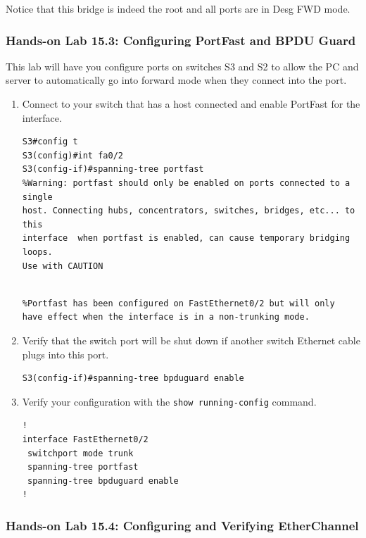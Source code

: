 Notice that this bridge is indeed the root and all ports are in Desg FWD
mode.

\subsubsection[Hands-on Lab 15.3: Configuring PortFast and BPDU
Guard]{\texorpdfstring{\protect\hypertarget{c15.xhtmlux5cux23c15-sec-27}{}{}Hands-on
Lab 15.3: Configuring PortFast and BPDU
Guard}{Hands-on Lab 15.3: Configuring PortFast and BPDU Guard}}

This lab will have you configure ports on switches S3 and S2 to allow
the PC and server to automatically go into forward mode when they
connect into the port.

\begin{enumerate}
\item
  Connect to your switch that has a host connected and enable PortFast
  for the interface.

\begin{verbatim}
S3#config t
S3(config)#int fa0/2
S3(config-if)#spanning-tree portfast
%Warning: portfast should only be enabled on ports connected to a single
host. Connecting hubs, concentrators, switches, bridges, etc... to this
interface  when portfast is enabled, can cause temporary bridging loops.
Use with CAUTION
\end{verbatim}

\begin{verbatim}
 
%Portfast has been configured on FastEthernet0/2 but will only
have effect when the interface is in a non-trunking mode.
\end{verbatim}
\item
  Verify that the switch port will be shut down if another switch
  Ethernet cable plugs into this port.

\begin{verbatim}
S3(config-if)#spanning-tree bpduguard enable
\end{verbatim}
\item
  Verify your configuration with the \texttt{show\ running-config}
  command.

\begin{verbatim}
!
interface FastEthernet0/2
 switchport mode trunk
 spanning-tree portfast
 spanning-tree bpduguard enable
!
\end{verbatim}
\end{enumerate}

\subsubsection[Hands-on Lab 15.4: Configuring and Verifying
EtherChannel]{\texorpdfstring{\protect\hypertarget{c15.xhtmlux5cux23c15-sec-28}{}{}Hands-on
Lab 15.4: Configuring and Verifying
EtherChannel}{Hands-on Lab 15.4: Configuring and Verifying EtherChannel}}

